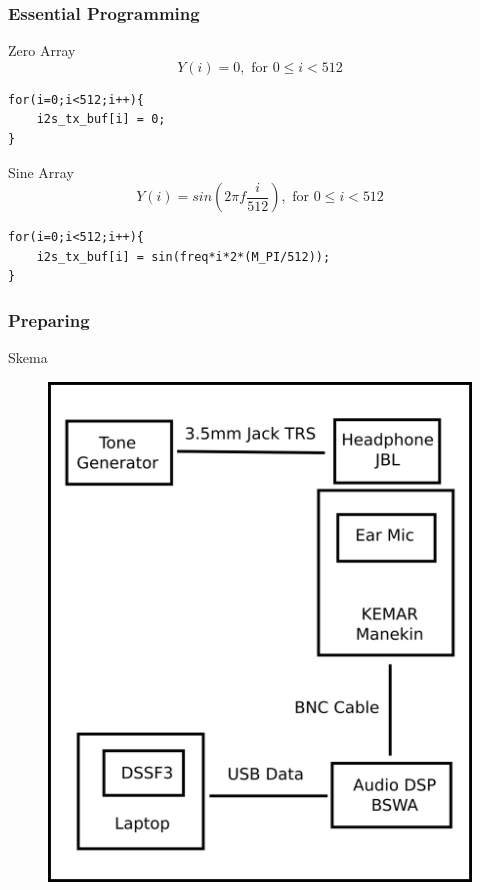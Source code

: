 \documentclass[table,dvipsnames,10pt]{beamer}
\begin{document}
	\begin{frame}[fragile]
	\frametitle{Essential Programming}
	\begin{exampleblock}{Zero Array} 
\[ Y(i) = 0, \text{ for } 0 \leq i < 512 \]
	\end{exampleblock}
	\begin{exampleblock}{} 
	\begin{verbatim}
for(i=0;i<512;i++){
	i2s_tx_buf[i] = 0;
}
	\end{verbatim}
	\end{exampleblock}

	\begin{exampleblock}{Sine Array} 
		\[ Y(i) = sin(2\pi f \frac{i}{512}), \text{ for } 0 \leq i < 512 \]
	\end{exampleblock}
	\begin{exampleblock}{} 
		\begin{verbatim}
for(i=0;i<512;i++){
	i2s_tx_buf[i] = sin(freq*i*2*(M_PI/512));
}
		\end{verbatim}
	\end{exampleblock}
	\end{frame}

	\begin{frame}
	\frametitle{Preparing}
	\begin{exampleblock}{Skema}
		\begin{figure}[H]
			\centering
			\includegraphics[width=0.5\linewidth]{images/kemar}
		\end{figure} 
	\end{exampleblock}
	\end{frame}
\end{document}
